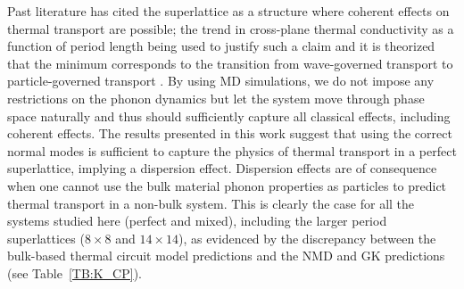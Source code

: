 
Past literature has cited the superlattice as a structure where coherent effects on thermal transport are possible; the trend in cross-plane thermal conductivity as a function of period length being used to justify such a claim \cite{PhysRevB.67.195311,PhysRevB.72.174302,PhysRevB.61.3091} and it is theorized that the minimum corresponds to the transition from wave-governed transport to particle-governed transport \cite{PhysRevLett.84.927,PhysRevB.56.10754}. %
By using MD simulations, we do not impose any restrictions on the phonon dynamics but let the system move through phase space naturally and thus should sufficiently capture all classical effects, including coherent effects. The results presented in this work suggest that using the correct normal modes is sufficient to capture the physics of thermal transport in a perfect superlattice, implying a dispersion effect. Dispersion effects are of consequence when one cannot use the bulk material phonon properties as particles to predict thermal transport in a non-bulk system. This is clearly the case for all the systems studied here (perfect and mixed), including the larger period superlattices ($8 \times 8$ and $14 \times 14$), as evidenced by the discrepancy between the bulk-based thermal circuit model predictions and the NMD and GK predictions (see Table~\ref{TB:K_CP}).

